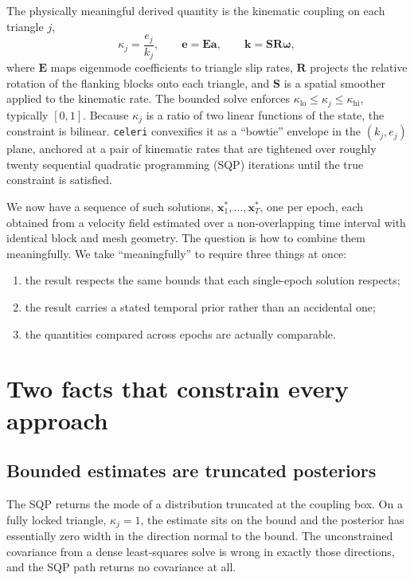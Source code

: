 \documentclass[11pt]{article}
\newcommand{\vect}[1]{\bm{#1}}
\newcommand{\mat}[1]{\mathbf{#1}}
\newcommand{\code}[1]{\texttt{#1}}
\begin{document}
The physically meaningful derived quantity is the kinematic coupling on each triangle $j$,
\begin{equation}
\kappa_j = \frac{e_j}{k_j}, \qquad \vect{e} = \mat{E}\vect{a}, \qquad \vect{k} = \mat{S}\mat{R}\vect{\omega},
\label{eq:coupling}
\end{equation}
where $\mat{E}$ maps eigenmode coefficients to triangle slip rates, $\mat{R}$ projects the relative rotation of the flanking blocks onto each triangle, and $\mat{S}$ is a spatial smoother applied to the kinematic rate. The bounded solve enforces $\kappa_{\mathrm{lo}} \le \kappa_j \le \kappa_{\mathrm{hi}}$, typically $[0,1]$. Because $\kappa_j$ is a ratio of two linear functions of the state, the constraint is bilinear. \code{celeri} convexifies it as a ``bowtie'' envelope in the $(k_j, e_j)$ plane, anchored at a pair of kinematic rates that are tightened over roughly twenty sequential quadratic programming (SQP) iterations until the true constraint is satisfied.

We now have a sequence of such solutions, $\vect{x}_1^\ast, \dots, \vect{x}_T^\ast$, one per epoch, each obtained from a velocity field estimated over a non-overlapping time interval with identical block and mesh geometry. The question is how to combine them meaningfully. We take ``meaningfully'' to require three things at once:
\begin{enumerate}[nosep]
\item the result respects the same bounds that each single-epoch solution respects;
\item the result carries a stated temporal prior rather than an accidental one;
\item the quantities compared across epochs are actually comparable.
\end{enumerate}

\section{Two facts that constrain every approach}

\subsection{Bounded estimates are truncated posteriors}

The SQP returns the mode of a distribution truncated at the coupling box. On a fully locked triangle, $\kappa_j = 1$, the estimate sits on the bound and the posterior has essentially zero width in the direction normal to the bound. The unconstrained covariance from a dense least-squares solve is wrong in exactly those directions, and the SQP path returns no covariance at all.
\end{document}
